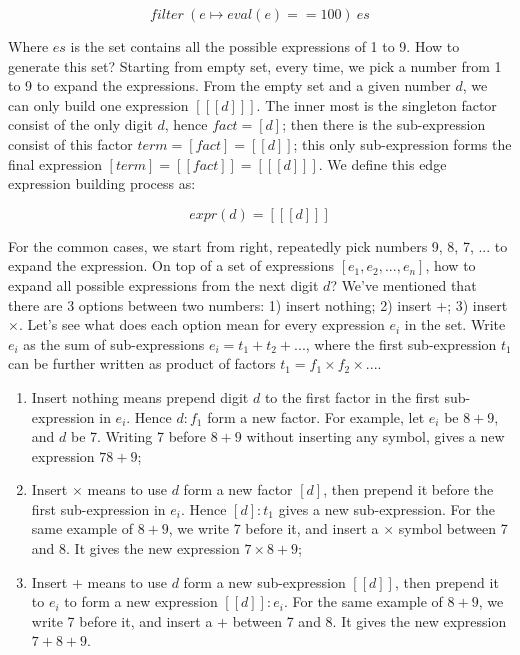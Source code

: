 \documentclass[b5paper]{article}
\begin{document}
\[
filter\ (e \mapsto eval(e) == 100)\ es
\]

Where $es$ is the set contains all the possible expressions of 1 to 9. How to generate this set? Starting from empty set, every time, we pick a number from 1 to 9 to expand the expressions. From the empty set and a given number $d$, we can only build one expression $[[[d]]]$. The inner most is the singleton factor consist of the only digit $d$, hence $fact = [d]$; then there is the sub-expression consist of this factor $term = [fact] = [[d]]$; this only sub-expression forms the final expression $[term] = [[fact]] = [[[d]]]$. We define this edge expression building process as:

\[
expr(d) = [[[d]]]
\]

For the common cases, we start from right, repeatedly pick numbers 9, 8, 7, ... to expand the expression. On top of a set of expressions $[e_1, e_2, ..., e_n]$, how to expand all possible expressions from the next digit $d$? We've mentioned that there are 3 options between two numbers: 1) insert nothing; 2) insert +; 3) insert $\times$. Let's see what does each option mean for every expression $e_i$ in the set. Write $e_i$ as the sum of sub-expressions $e_i = t_1 + t_2 + ...$, where the first sub-expression $t_1$ can be further written as product of factors $t_1 = f_1 \times f_2 \times ...$.

\begin{enumerate}
\item Insert nothing means prepend digit $d$ to the first factor in the first sub-expression in $e_i$. Hence $d:f_1$ form a new factor. For example, let $e_i$ be $8 + 9$, and $d$ be 7. Writing 7 before $8 + 9$ without inserting any symbol, gives a new expression $78 + 9$;

\item Insert $\times$ means to use $d$ form a new factor $[d]$, then prepend it before the first sub-expression in $e_i$. Hence $[d]:t_1$ gives a new sub-expression. For the same example of $8 + 9$, we write 7 before it, and insert a $\times$ symbol between 7 and 8. It gives the new expression $7 \times 8 + 9$;

\item Insert + means to use $d$ form a new sub-expression $[[d]]$, then prepend it to $e_i$ to form a new expression $[[d]]:e_i$. For the same example of $8 + 9$, we write 7 before it, and insert a + between 7 and 8. It gives the new expression $7 + 8 + 9$.
\end{enumerate}
\end{document}
